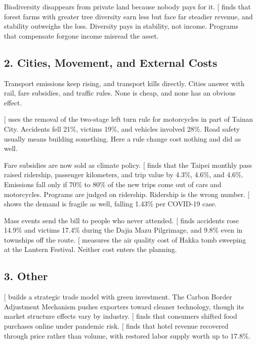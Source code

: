 \documentclass[
  11pt,
]{article}
\begin{document}
Biodiversity disappears from private land because nobody pays for it.
{[}\citeproc{ref-lee2025forest}{5}{]} finds that forest farms with
greater tree diversity earn less but face far steadier revenue, and
stability outweighs the loss. Diversity pays in stability, not income.
Programs that compensate forgone income misread the asset.

\subsection{2. Cities, Movement, and External
Costs}\label{cities-movement-and-external-costs}

Transport emissions keep rising, and transport kills directly. Cities
answer with rail, fare subsidies, and traffic rules. None is cheap, and
none has an obvious effect.

{[}\citeproc{ref-liou2026hookturn}{6}{]} uses the removal of the
two-stage left turn rule for motorcycles in part of Tainan City.
Accidents fell 21\%, victims 19\%, and vehicles involved 28\%. Road
safety usually means building something. Here a rule change cost nothing
and did as well.

Fare subsidies are now sold as climate policy.
{[}\citeproc{ref-liou2025monthly}{7}{]} finds that the Taipei monthly
pass raised ridership, passenger kilometers, and trip value by 4.3\%,
4.6\%, and 4.6\%. Emissions fall only if 70\% to 80\% of the new trips
come out of cars and motorcycles. Programs are judged on ridership.
Ridership is the wrong number. {[}\citeproc{ref-chang2021metro}{8}{]}
shows the demand is fragile as well, falling 1.43\% per COVID-19 case.

Mass events send the bill to people who never attended.
{[}\citeproc{ref-liou2026religious}{9}{]} finds accidents rose 14.9\%
and victims 17.4\% during the Dajia Mazu Pilgrimage, and 9.8\% even in
townships off the route. {[}\citeproc{ref-chang2024air}{10}{]} measures
the air quality cost of Hakka tomb sweeping at the Lantern Festival.
Neither cost enters the planning.

\subsection{3. Other}\label{other}

{[}\citeproc{ref-liou2025cbam}{11}{]} builds a strategic trade model
with green investment. The Carbon Border Adjustment Mechanism pushes
exporters toward cleaner technology, though its market structure effects
vary by industry. {[}\citeproc{ref-liou2024covid}{12}{]} finds that
consumers shifted food purchases online under pandemic risk.
{[}\citeproc{ref-liou2026hotel}{13}{]} finds that hotel revenue
recovered through price rather than volume, with restored labor supply
worth up to 17.8\%.
\end{document}
